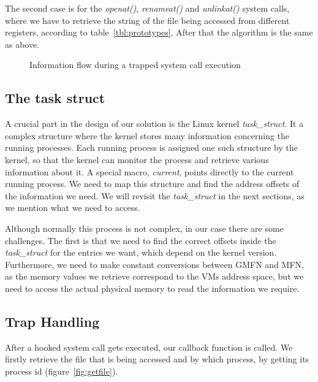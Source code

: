 \par The second case is for the \emph{openat()}, \emph{renameat()} and \emph{unlinkat()} system calls, where we have to retrieve the string of the file being accessed from different registers, according to table~\ref{tbl:prototypes}. After that the algorithm is the same as above.


\begin{figure}[ht]
	\centering
	
	\caption{Information flow during a trapped system call execution}
	\label{fig:overview}
\end{figure}


\subsection{The task struct}\label{sub:struct}
A crucial part in the design of our solution is the Linux kernel \textit{task\_struct}. It a complex structure where the kernel stores many information concerning the running processes. Each running process is assigned one such structure by the kernel, so that the kernel can monitor the process and retrieve various information about it. A special macro, \textit{current}, points directly to the current running process. We need to map this structure and find the address offsets of the information we need. We will revisit the \textit{task\_struct} in the next sections, as we mention what we need to access.

\par Although normally this process is not complex, in our case there are some challenges. The first is that we need to find the correct offsets inside the \textit{task\_struct} for the entries we want, which depend on the kernel version. Furthermore, we need to make constant conversions between \ac{GMFN} and \ac{MFN}, as the memory values we retrieve correspond to the \ac{VM}s address space, but we need to access the actual physical memory to read the information we require.


\subsection{Trap Handling}\label{sub:handling}

After a hooked system call gets executed, our callback function is called. We firstly retrieve the file that is being accessed and by which process, by getting its process id (figure~\ref{fig:getfile}). 

